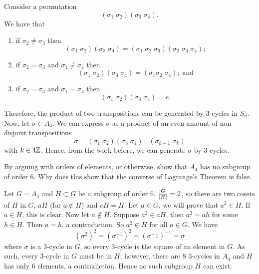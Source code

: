 \begin{solution}
    Consider a permutation
    \[
        (\sigma_1 \; \sigma_2)(\sigma_3 \; \sigma_4).
    \]
    We have that
    \begin{enumerate}
        \item if $\sigma_2 \neq \sigma_3$ then
            \[
                (\sigma_1 \; \sigma_2)(\sigma_3 \; \sigma_4)
                = (\sigma_1 \; \sigma_2 \; \sigma_3)
                  (\sigma_2 \; \sigma_3 \; \sigma_4);
            \]

        \item if $\sigma_2 = \sigma_3$ and $\sigma_1 \neq \sigma_4$ then
            \[
                (\sigma_1 \; \sigma_2)(\sigma_3 \; \sigma_4)
                = (\sigma_1 \sigma_2 \; \sigma_4); \;\text{and}
            \]

        \item if $\sigma_2 = \sigma_3$ and $\sigma_1 = \sigma_4$ then
            \[  
                (\sigma_1 \; \sigma_2)(\sigma_3 \; \sigma_4) = e.
            \]
    \end{enumerate}
    Therefore, the product of two transpositions
    can be generated by $3$-cycles in $S_n$.
    Now, let $\sigma \in A_4$. 
    We can express $\sigma$ as a product of an even amount of non-disjoint transpositions
    \[
        \sigma = (\sigma_1     \; \sigma_2) 
                 (\sigma_3     \; \sigma_4) \ldots
                 (\sigma_{k-1} \; \sigma_k)
    \]
    with $k \in 4\mathbb{Z}$.
    Hence, from the work before, we can generate $\sigma$ by $3$-cycles.
\end{solution}

\setcounter{question}{34}
\question 
By arguing with orders of elements, or otherwise,
show that $A_4$ has no subgroup of order $6$.
Why does this show that the converse of Lagrange's Theorem is false.

\begin{solution}
    Let $G = A_4$ and $H \subset G$ be a subgroup of order $6$.
    $\frac{\left\lvert G\right\rvert}{\left\lvert H\right\rvert} = 2$, so there are two cosets of $H$ in $G$,
    $aH$ (for $a \not \in H$) and $eH = H$.
    Let $a \in G$, we will prove that $a^2 \in H$.
    If $a \in H$, this is clear.
    Now let $a \not \in H$.
    Suppose $a^2 \in aH$, then $a^2 = ah$ for some $h \in H$.
    Then $a = h$, a contradiction.
    So $a^2 \in H$ for all $a \in G$.
    We have
    \[
        (\sigma^2)^2 = (\sigma^{-1})^2 = (\sigma^-1)^{-1} = \sigma
    \]
    where $\sigma$ is a $3$-cycle in $G$, 
    so every $3$-cycle is the square of an element in $G$.
    As such, every $3$-cycle in $G$ must be in $H$;
    however, there are $8$ $3$-cycles in $A_4$ and $H$ has only $6$ elements,
    a contradiction.
    Hence no such subgroup $H$ can exist.
\end{solution}
